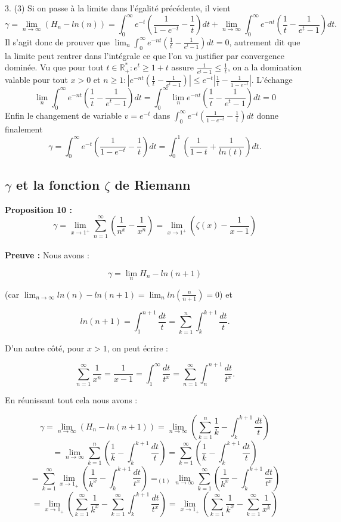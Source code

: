 \documentclass[a4paper,12pt]{article}
\begin{document}
3. (3) Si on passe à la limite dans l'égalité précédente, il vient
\[
\gamma=\lim_{n \to \infty}(H_{n}-ln(n))=\int_{0}^{\infty}e^{-t}\left(\frac{1}{1-e^{-t}}-\frac{1}{t}\right)dt+\lim_{n \to \infty}\int_{0}^{\infty}e^{-nt}\left(\frac{1}{t}-\frac{1}{e^{t}-1}\right)dt.
\]
Il s'agit donc de prouver que \(\lim_{n}\int_{0}^{\infty}e^{-nt}\left(\frac{1}{t}-\frac{1}{e^{t}-1}\right)dt=0\), autrement dit que la limite peut rentrer dans l'intégrale ce que l'on va justifier par convergence dominée. Vu que pour tout \(t\in\mathbb{R}_+^* : e^{t}\geq 1+t\) assure \(\frac{1}{e^{t}-1}\leq\frac{1}{t}\), on a la domination valable pour tout \(x>0\) et \(n\geq 1 : |e^{-nt}\left(\frac{1}{t}-\frac{1}{e^{t}-1}\right)|\leq e^{-t}\left|\frac{1}{t}-\frac{1}{1-e^{-t}}\right|\). L'échange
\[
\lim_{n}\int_{0}^{\infty}e^{-nt}\left(\frac{1}{t}-\frac{1}{e^{t}-1}\right)dt= \int_{0}^{\infty}\lim_{n}e^{-nt}\left(\frac{1}{t}-\frac{1}{e^{t}-1}\right)dt=0
\]
Enfin le changement de variable \(v=e^{-t}\) dans \(\int_{0}^{\infty}e^{-t}\left(\frac{1}{1-e^{-t}}-\frac{1}{t}\right)dt\) donne finalement
\[
\gamma=\int_{0}^{\infty}e^{-t}\left(\frac{1}{1-e^{-t}}-\frac{1}{t}\right)dt= \int_{0}^{1}\left(\frac{1}{1-t}+\frac{1}{ln(t)}\right)dt.
\]

\subsection{$\gamma$ et la fonction $\zeta$ de Riemann}

\textbf{Proposition 10 :} \[
\gamma = \lim_{x\to 1^+} \sum_{n=1}^\infty \left(\frac{1}{n^x} - \frac{1}{x^n}\right) = \lim_{x\to 1^+} \left(\zeta(x) - \frac{1}{x-1}\right)
\] \\

\textbf{Preuve : }Nous avons : 

\[
\gamma = \lim_{n} H_{n} - ln(n+1)
\]

(car \(\lim_{n\to\infty} ln(n) - ln(n+1) = \lim_{n} ln\left(\frac{n}{n+1}\right) = 0\)) et

\[
ln(n+1) = \int_{1}^{n+1} \frac{dt}{t} = \sum_{k=1}^{n} \int_{k}^{k+1} \frac{dt}{t}.
\]

D'un autre côté, pour \(x > 1\), on peut écrire :

\[
\sum_{n=1}^{\infty} \frac{1}{x^{n}} = \frac{1}{x-1} = \int_{1}^{\infty} \frac{dt}{t^{x}} = \sum_{n=1}^{\infty} \int_{n}^{n+1} \frac{dt}{t^{x}}.
\]

En réunissant tout cela nous avons :

\[
\gamma = \lim_{n\to\infty} \left(H_{n} - ln(n+1)\right) = \lim_{n\to\infty} \left(\sum_{k=1}^{n} \frac{1}{k} - \int_{k}^{k+1} \frac{dt}{t}\right)
\]
\[
= \lim_{n\to\infty} \sum_{k=1}^{n} \left(\frac{1}{k} - \int_{k}^{k+1} \frac{dt}{t}\right) = \sum_{k=1}^{\infty} \left(\frac{1}{k} - \int_{k}^{k+1} \frac{dt}{t}\right)
\]
\[
= \sum_{k=1}^{\infty} \lim_{x\to 1_{+}} \left(\frac{1}{k^{x}} - \int_{k}^{k+1} \frac{dt}{t^{x}}\right) =_{(1)} \lim_{n \to \infty} \sum_{k= 1}^{\infty} \left(\frac{1}{k^{x}} - \int_{k}^{k+1} \frac{dt}{t^{x}}\right)
\]
\[
= \lim_{x\to 1_{+}} \left(\sum_{k=1}^{\infty} \frac{1}{k^{x}} - \sum_{k=1}^{\infty} \int_{k}^{k+1} \frac{dt}{t^{x}}\right) = \lim_{x\to 1_{+}} \left(\sum_{k=1}^{\infty} \frac{1}{k^{x}} - \sum_{k=1}^{\infty} \frac{1}{x^{k}}\right)
\]
\end{document}
